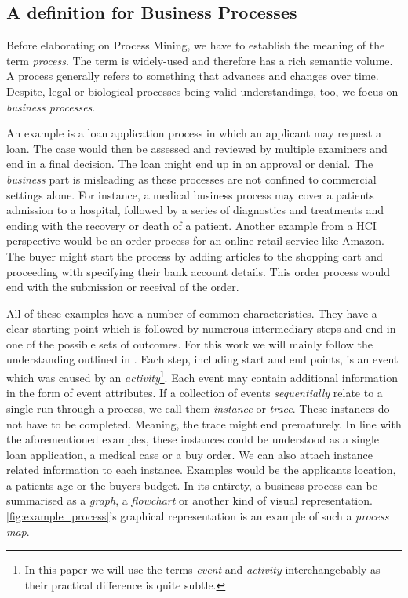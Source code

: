 \documentclass[./../../paper.tex]{subfiles}
\begin{document}
\subsection{A definition for Business Processes}
Before elaborating on Process Mining, we have to establish the meaning of the term \emph{process}. The term is widely-used and therefore has a rich semantic volume. A process generally refers to something that advances and changes over time\autocite{_DefinitionPROCESS_}.
Despite, legal or biological processes being valid understandings, too, we focus on \emph{business processes}.

An example is a loan application process in which an applicant may request a loan. The case would then be assessed and reviewed by multiple examiners and end in a final decision. The loan might end up in an approval or denial. The \emph{business} part is misleading as these processes are not confined to commercial settings alone. For instance, a medical business process may cover a patients admission to a hospital, followed by a series of diagnostics and treatments and ending with the recovery or death of a patient. Another example from a \gls{HCI} perspective would be an order process for an online retail service like Amazon. The buyer might start the process by adding articles to the shopping cart and proceeding with specifying their bank account details. This order process would end with the submission or receival of the order.

All of these examples have a number of common characteristics. They have a clear starting point which is followed by numerous intermediary steps and end in one of the possible sets of outcomes. For this work we will mainly follow the understanding outlined in \citeauthor{vanderaalst_ProcessMiningManifesto_2012}\autocite{vanderaalst_ProcessMiningManifesto_2012}. Each step, including start and end points, is an \gls{event} which was caused by an \emph{activity}\footnote{In this paper we will use the terms \emph{event} and \emph{activity} interchangebably as their practical difference is quite subtle.}. Each \gls{event} may contain additional information in the form of event attributes. If a collection of events \emph{sequentially} relate to a single run through a process, we call them \emph{\gls{instance}} or \emph{trace}. These instances do not have to be completed. Meaning, the trace might end prematurely. In line with the aforementioned examples, these \glspl{instance} could be understood as a single loan application, a medical case or a buy order. We can also attach \gls{instance} related information to each instance. Examples would be the applicants location, a patients age or the buyers budget. In its entirety, a business process can be summarised as a \emph{graph}, a \emph{flowchart} or another kind of visual representation. \autoref{fig:example_process}'s graphical representation is an example of such a \emph{process map}\autocite{vanderaalst_ProcessMiningManifesto_2012}. 
\end{document}
